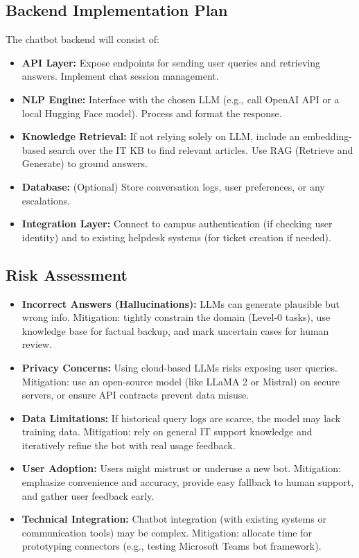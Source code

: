 \documentclass{article.cls}
\begin{document}
    \subsection{Backend Implementation Plan}
    The chatbot backend will consist of:
    \begin{itemize}
        \item \textbf{API Layer:} Expose endpoints for sending user queries and retrieving answers. Implement chat session management.
        \item \textbf{NLP Engine:} Interface with the chosen LLM (e.g., call OpenAI API or a local Hugging Face model). Process and format the response.
        \item \textbf{Knowledge Retrieval:} If not relying solely on LLM, include an embedding-based search over the IT KB to find relevant articles. Use RAG (Retrieve and Generate) to ground answers.
        \item \textbf{Database:} (Optional) Store conversation logs, user preferences, or any escalations.
        \item \textbf{Integration Layer:} Connect to campus authentication (if checking user identity) and to existing helpdesk systems (for ticket creation if needed).
    \end{itemize}

    \subsection{Risk Assessment}
    \begin{itemize}
        \item \textbf{Incorrect Answers (Hallucinations):} LLMs can generate plausible but wrong info. Mitigation: tightly constrain the domain (Level-0 tasks), use knowledge base for factual backup, and mark uncertain cases for human review.
        \item \textbf{Privacy Concerns:} Using cloud-based LLMs risks exposing user queries. Mitigation: use an open-source model (like LLaMA 2 or Mistral) on secure servers, or ensure API contracts prevent data misuse.
        \item \textbf{Data Limitations:} If historical query logs are scarce, the model may lack training data. Mitigation: rely on general IT support knowledge and iteratively refine the bot with real usage feedback.
        \item \textbf{User Adoption:} Users might mistrust or underuse a new bot. Mitigation: emphasize convenience and accuracy, provide easy fallback to human support, and gather user feedback early.
        \item \textbf{Technical Integration:} Chatbot integration (with existing systems or communication tools) may be complex. Mitigation: allocate time for prototyping connectors (e.g., testing Microsoft Teams bot framework).
    \end{itemize}
\end{document}
